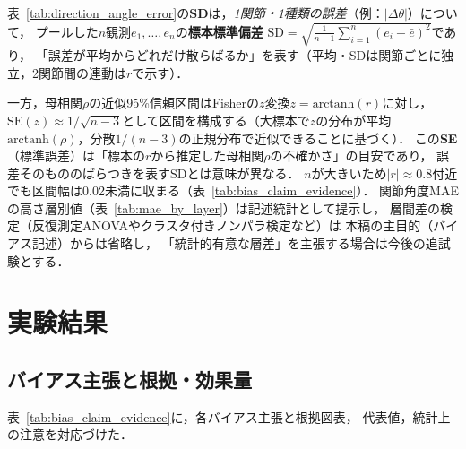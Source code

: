 \documentclass[fleqn]{ieej}
\begin{document}
表~\ref{tab:direction_angle_error}の\textbf{SD}は，\emph{1関節・1種類の誤差}（例：$|\Delta\theta|$）について，
プールした$n$観測$e_1,\ldots,e_n$の\textbf{標本標準偏差}
$\mathrm{SD}=\sqrt{\frac{1}{n-1}\sum_{i=1}^{n}(e_i-\bar{e})^2}$であり，
「誤差が平均からどれだけ散らばるか」を表す（平均・SDは関節ごとに独立，2関節間の連動は$r$で示す）．

一方，母相関$\rho$の近似95\%信頼区間はFisherの$z$変換$z=\mathrm{arctanh}(r)$に対し，
$\mathrm{SE}(z)\approx 1/\sqrt{n-3}$として区間を構成する（大標本で$z$の分布が平均$\mathrm{arctanh}(\rho)$，分散$1/(n-3)$の正規分布で近似できることに基づく）．
この\textbf{SE}（標準誤差）は「標本の$r$から推定した母相関$\rho$の不確かさ」の目安であり，
誤差そのもののばらつきを表すSDとは意味が異なる．
$n$が大きいため$|r|\approx 0.8$付近でも区間幅は0.02未満に収まる（表~\ref{tab:bias_claim_evidence}）．
関節角度MAEの高さ層別値（表~\ref{tab:mae_by_layer}）は記述統計として提示し，
層間差の検定（反復測定ANOVAやクラスタ付きノンパラ検定など）は
本稿の主目的（バイアス記述）からは省略し，
「統計的有意な層差」を主張する場合は今後の追試験とする．

\section{実験結果}

\subsection{バイアス主張と根拠・効果量}

表~\ref{tab:bias_claim_evidence}に，各バイアス主張と根拠図表，
代表値，統計上の注意を対応づけた．
\end{document}
